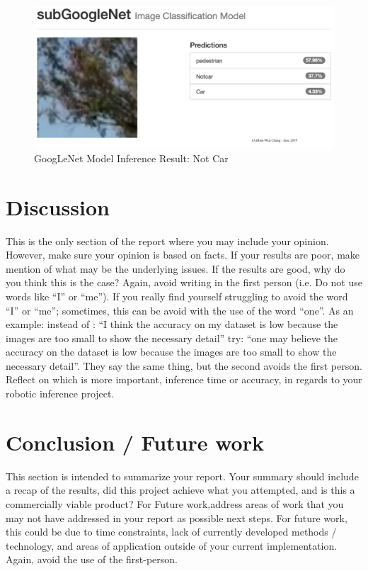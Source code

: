 \documentclass[10pt,journal,compsoc]{IEEEtran}
\begin{document}
\begin{figure}[thpb]
      \centering
      \includegraphics[width=\linewidth]{NotCarInference.png}
      \caption{GoogLeNet Model Inference Result: Not Car}
      \label{fig:robot1}
\end{figure}


\section{Discussion}
This is the only section of the report where you may include your opinion. However, make sure your opinion is based on facts. If your results are poor, make mention of what may be the underlying issues. If the results are good, why do you think this is the case? Again, avoid writing in the first person (i.e. Do not use words like “I” or “me”). If you really find yourself struggling to avoid the word “I” or “me”; sometimes, this can be avoid with the use of the word “one”. As an example: instead of : “I think the accuracy on my dataset is low because the images are too small to show the necessary detail” try: “one may believe the accuracy on the dataset is low because the images are too small to show the necessary detail”. They say the same thing, but the second avoids the first person. 
Reflect on which is more important, inference time or accuracy, in regards to your robotic inference project.

\section{Conclusion / Future work}
This section is intended to summarize your report. Your summary should include a recap of the results, did this project achieve what you attempted, and is this a commercially viable product? 
For Future work,address areas of work that you may not have addressed in your report as possible next steps. For future work, this could be due to time constraints, lack of currently developed methods / technology, and areas of application outside of your current implementation. Again, avoid the use of the first-person.
\end{document}
